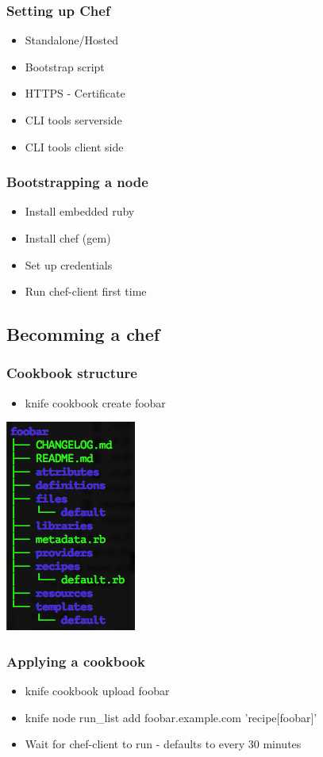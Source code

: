 \frame
{
  \frametitle{Setting up Chef}

  \begin{itemize}
  \item<1-> Standalone/Hosted
  \item<2-> Bootstrap script
  \item<3-> HTTPS - Certificate
  \item<4-> CLI tools serverside
  \item<5-> CLI tools client side
  \end{itemize}
}

\frame
{
  \frametitle{Bootstrapping a node}

  \begin{itemize}
  \item<1-> Install embedded ruby
  \item<2-> Install chef (gem)
  \item<3-> Set up credentials
  \item<4-> Run chef-client first time
  \end{itemize}
}

\subsection{Becomming a chef}
\frame
{
  \frametitle{Cookbook structure}

  \begin{itemize}
  \item knife cookbook create foobar
  \end{itemize}
  \begin{center}
  \includegraphics[scale=0.5]{images/cookbook_structure.png}
  \end{center}
}

\frame
{
  \frametitle{Applying a cookbook}

  \begin{itemize}
    \item knife cookbook upload foobar
    \item knife node run\_list add foobar.example.com 'recipe[foobar]'
    \item Wait for chef-client to run - defaults to every 30 minutes
  \end{itemize}
}

